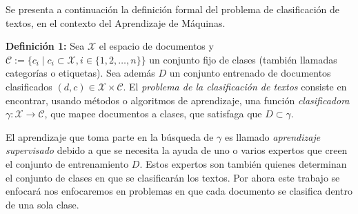 \documentclass[t,compress,10pt,xcolor=dvipsnames]{beamer}
\begin{document}
{		\framebreak
		
		Se presenta a continuaci\'on la definici\'on formal del problema de clasificaci\'on de textos, en el contexto del Aprendizaje de M\'aquinas.
		
		
		\textbf{Definici\'on 1:}
			Sea $\mathcal{{X}}$ el espacio de documentos y $\mathcal{C} := \{c_i \mid c_i \subset \mathcal{X}, i \in \{ 1,2,\dots,n\} \}$ un conjunto fijo de clases (tambi\'en llamadas categor\'ias o etiquetas). Sea adem\'as $D$ un conjunto entrenado de documentos clasificados $(d,c) \in \mathcal X \times \mathcal{C}$. El \emph{problema de la clasificaci\'on de textos} consiste en encontrar, usando m\'etodos o algoritmos de aprendizaje, una funci\'on \emph{clasificadora} $\gamma : \mathcal{X} \rightarrow \mathcal{C}$, que mapee documentos a clases, que satisfaga que $D \subset \gamma$. 	
		
		\framebreak
		
		El aprendizaje que toma parte en la b\'usqueda de $\gamma$ es llamado \emph{aprendizaje supervisado} debido a que se necesita la ayuda de uno o varios expertos que creen el conjunto de entrenamiento $D$. Estos expertos son  tambi\'en quienes determinan el conjunto de clases en que se clasificar\'an los textos. Por ahora este trabajo se enfocar\'a nos enfocaremos en problemas en que cada documento se clasifica dentro de una sola clase.
		
	
	}
	
\end{document}
